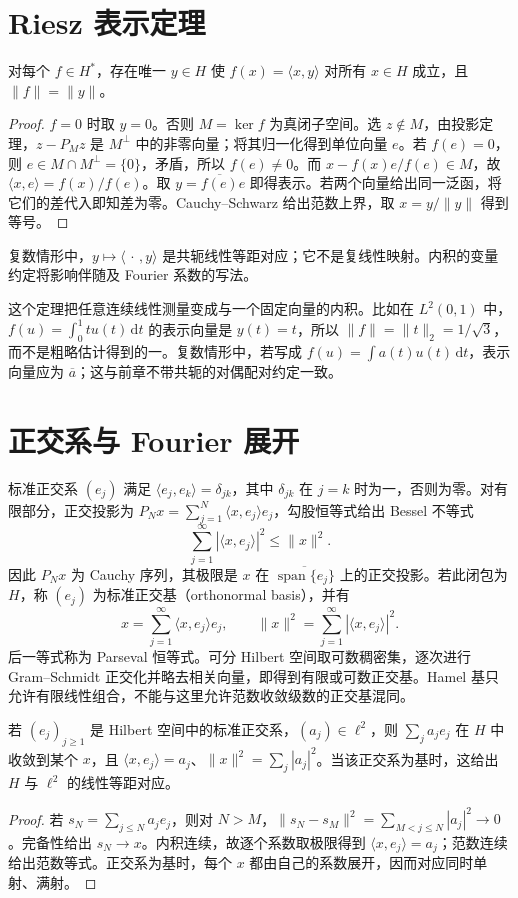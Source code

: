 \documentclass[UTF8,12pt,a4paper,fontset=fandol]{ctexbook}
\begin{document}
\section{Riesz 表示定理}
\begin{theorem}\label{thm:fa-riesz-representation}
对每个 $f\in H^*$，存在唯一 $y\in H$ 使 $f(x)=\langle x,y\rangle$ 对所有 $x\in H$ 成立，且 $\|f\|=\|y\|$。
\end{theorem}
\begin{proof}
$f=0$ 时取 $y=0$。否则 $M=\ker f$ 为真闭子空间。选 $z\notin M$，由投影定理，$z-P_Mz$ 是 $M^\perp$ 中的非零向量；将其归一化得到单位向量 $e$。若 $f(e)=0$，则 $e\in M\cap M^\perp=\{0\}$，矛盾，所以 $f(e)\ne0$。而 $x-f(x)e/f(e)\in M$，故 $\langle x,e\rangle=f(x)/f(e)$。取 $y=\overline{f(e)}e$ 即得表示。若两个向量给出同一泛函，将它们的差代入即知差为零。Cauchy--Schwarz 给出范数上界，取 $x=y/\|y\|$ 得到等号。
\end{proof}
复数情形中，$y\mapsto\langle\,\cdot\,,y\rangle$ 是共轭线性等距对应；它不是复线性映射。内积的变量约定将影响伴随及 Fourier 系数的写法。

这个定理把任意连续线性测量变成与一个固定向量的内积。比如在 $L^2(0,1)$ 中，$f(u)=\int_0^1t u(t)\,\mathrm dt$ 的表示向量是 $y(t)=t$，所以 $\|f\|=\|t\|_2=1/\sqrt3$，而不是粗略估计得到的一。复数情形中，若写成 $f(u)=\int a(t)u(t)\,\mathrm dt$，表示向量应为 $\overline a$；这与前章不带共轭的对偶配对约定一致。

\section{正交系与 Fourier 展开}
标准正交系 $(e_j)$ 满足 $\langle e_j,e_k\rangle=\delta_{jk}$，其中 $\delta_{jk}$ 在 $j=k$ 时为一，否则为零。对有限部分，正交投影为 $P_Nx=\sum_{j=1}^N\langle x,e_j\rangle e_j$，勾股恒等式给出 Bessel 不等式
\[
 \sum_{j=1}^{\infty}|\langle x,e_j\rangle|^2\leq\|x\|^2.
\]
因此 $P_Nx$ 为 Cauchy 序列，其极限是 $x$ 在 $\overline{\operatorname{span}\{e_j\}}$ 上的正交投影。若此闭包为 $H$，称 $(e_j)$ 为标准正交基（orthonormal basis），并有
\begin{equation}
 x=\sum_{j=1}^{\infty}\langle x,e_j\rangle e_j,
 \qquad \|x\|^2=\sum_{j=1}^{\infty}|\langle x,e_j\rangle|^2.
 \label{eq:fa-parseval}
\end{equation}
后一等式称为 Parseval 恒等式。可分 Hilbert 空间取可数稠密集，逐次进行 Gram--Schmidt 正交化并略去相关向量，即得到有限或可数正交基。Hamel 基只允许有限线性组合，不能与这里允许范数收敛级数的正交基混同。

\begin{proposition}[平方可和系数与向量的对应]\label{prop:fa-riesz-fischer}
若 $(e_j)_{j\geq1}$ 是 Hilbert 空间中的标准正交系，$(a_j)\in\ell^2$，则 $\sum_ja_je_j$ 在 $H$ 中收敛到某个 $x$，且 $\langle x,e_j\rangle=a_j$、$\|x\|^2=\sum_j|a_j|^2$。当该正交系为基时，这给出 $H$ 与 $\ell^2$ 的线性等距对应。
\end{proposition}
\begin{proof}
若 $s_N=\sum_{j\leq N}a_je_j$，则对 $N>M$，$\|s_N-s_M\|^2=\sum_{M<j\leq N}|a_j|^2\to0$。完备性给出 $s_N\to x$。内积连续，故逐个系数取极限得到 $\langle x,e_j\rangle=a_j$；范数连续给出范数等式。正交系为基时，每个 $x$ 都由自己的系数展开，因而对应同时单射、满射。
\end{proof}
\end{document}
